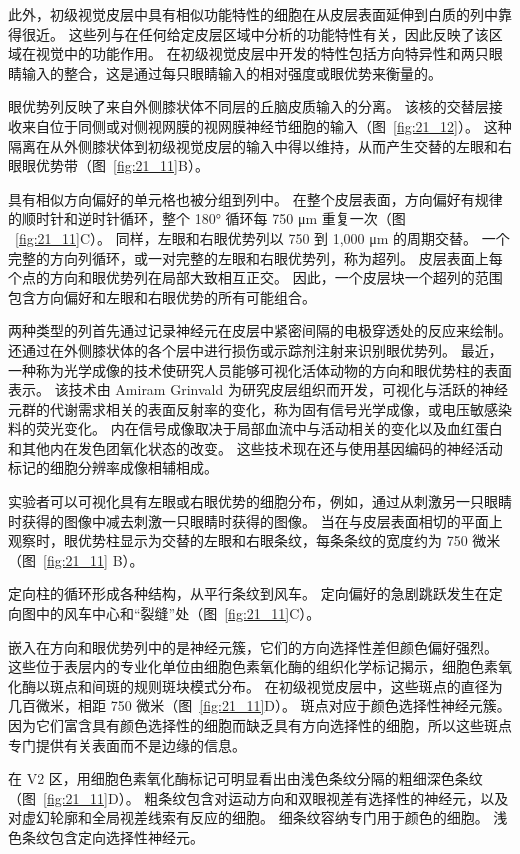 此外，初级视觉皮层中具有相似功能特性的细胞在从皮层表面延伸到白质的列中靠得很近。
这些列与在任何给定皮层区域中分析的功能特性有关，因此反映了该区域在视觉中的功能作用。
在初级视觉皮层中开发的特性包括方向特异性和两只眼睛输入的整合，这是通过每只眼睛输入的相对强度或眼优势来衡量的。


眼优势列反映了来自外侧膝状体不同层的丘脑皮质输入的分离。
该核的交替层接收来自位于同侧或对侧视网膜的视网膜神经节细胞的输入（图~\ref{fig:21_12}）。
这种隔离在从外侧膝状体到初级视觉皮层的输入中得以维持，从而产生交替的左眼和右眼眼优势带（图~\ref{fig:21_11}B）。


具有相似方向偏好的单元格也被分组到列中。
在整个皮层表面，方向偏好有规律的顺时针和逆时针循环，整个 180° 循环每 750 μm 重复一次（图 ~\ref{fig:21_11}C）。
同样，左眼和右眼优势列以 750 到 1,000 μm 的周期交替。
一个完整的方向列循环，或一对完整的左眼和右眼优势列，称为超列。
皮层表面上每个点的方向和眼优势列在局部大致相互正交。
因此，一个皮层块一个超列的范围包含方向偏好和左眼和右眼优势的所有可能组合。


两种类型的列首先通过记录神经元在皮层中紧密间隔的电极穿透处的反应来绘制。
还通过在外侧膝状体的各个层中进行损伤或示踪剂注射来识别眼优势列。
最近，一种称为光学成像的技术使研究人员能够可视化活体动物的方向和眼优势柱的表面表示。 
该技术由 Amiram Grinvald 为研究皮层组织而开发，可视化与活跃的神经元群的代谢需求相关的表面反射率的变化，称为固有信号光学成像，或电压敏感染料的荧光变化。 
内在信号成像取决于局部血流中与活动相关的变化以及血红蛋白和其他内在发色团氧化状态的改变。 
这些技术现在还与使用基因编码的神经活动标记的细胞分辨率成像相辅相成。


实验者可以可视化具有左眼或右眼优势的细胞分布，例如，通过从刺激另一只眼睛时获得的图像中减去刺激一只眼睛时获得的图像。 
当在与皮层表面相切的平面上观察时，眼优势柱显示为交替的左眼和右眼条纹，每条条纹的宽度约为 750 微米（图~\ref{fig:21_11} B）。


定向柱的循环形成各种结构，从平行条纹到风车。 
定向偏好的急剧跳跃发生在定向图中的风车中心和“裂缝”处（图~\ref{fig:21_11}C）。


嵌入在方向和眼优势列中的是神经元簇，它们的方向选择性差但颜色偏好强烈。
这些位于表层内的专业化单位由细胞色素氧化酶的组织化学标记揭示，细胞色素氧化酶以斑点和间斑的规则斑块模式分布。
在初级视觉皮层中，这些斑点的直径为几百微米，相距 750 微米（图~\ref{fig:21_11}D）。
斑点对应于颜色选择性神经元簇。
因为它们富含具有颜色选择性的细胞而缺乏具有方向选择性的细胞，所以这些斑点专门提供有关表面而不是边缘的信息。


在 V2 区，用细胞色素氧化酶标记可明显看出由浅色条纹分隔的粗细深色条纹（图~\ref{fig:21_11}D）。
粗条纹包含对运动方向和双眼视差有选择性的神经元，以及对虚幻轮廓和全局视差线索有反应的细胞。
细条纹容纳专门用于颜色的细胞。
浅色条纹包含定向选择性神经元。


